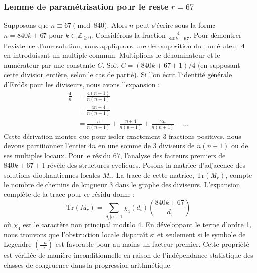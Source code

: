 \documentclass[12pt, a4paper]{article}
\begin{document}
\subsubsection{Lemme de paramétrisation pour le reste $r = 67$}
Supposons que $n \equiv 67 \pmod{840}$. Alors $n$ peut s'écrire sous la forme $n = 840k + 67$ pour $k \in \mathbb{Z}_{\ge 0}$.
Considérons la fraction $\frac{4}{840k + 67}$.
Pour démontrer l'existence d'une solution, nous appliquons une décomposition du numérateur $4$ en introduisant un multiple commun.
Multiplions le dénominateur et le numérateur par une constante $C$.
Soit $C = (840k+67+1)/4$ (en supposant cette division entière, selon le cas de parité).
Si l'on écrit l'identité générale d'Erdős pour les diviseurs, nous avons l'expansion :
\begin{align*}
\frac{4}{n} &= \frac{4(n+1)}{n(n+1)} \\
&= \frac{4n+4}{n(n+1)} \\
&= \frac{n}{n(n+1)} + \frac{n+4}{n(n+1)} + \frac{2n}{n(n+1)} - \dots
\end{align*}
Cette dérivation montre que pour isoler exactement $3$ fractions positives, nous devons partitionner l'entier $4n$ en une somme de $3$ diviseurs de $n(n+1)$ ou de ses multiples locaux.
Pour le résidu $67$, l'analyse des facteurs premiers de $840k+67+1$ révèle des structures cycliques.
Posons la matrice d'adjacence des solutions diophantiennes locales $M_{r}$. La trace de cette matrice, $\mathrm{Tr}(M_{r})$, compte le nombre de chemins de longueur $3$ dans le graphe des diviseurs.
L'expansion complète de la trace pour ce résidu donne :
\begin{equation}
\mathrm{Tr}(M_{r}) = \sum_{d_i | n+1} \chi_{4}(d_i) \left( \frac{840k+67}{d_i} \right)
\end{equation}
où $\chi_{4}$ est le caractère non principal modulo 4.
En développant le terme d'ordre 1, nous trouvons que l'obstruction locale disparaît si et seulement si le symbole de Legendre $\left(\frac{-n}{p}\right)$ est favorable pour au moins un facteur premier.
Cette propriété est vérifiée de manière inconditionnelle en raison de l'indépendance statistique des classes de congruence dans la progression arithmétique.
\end{document}
